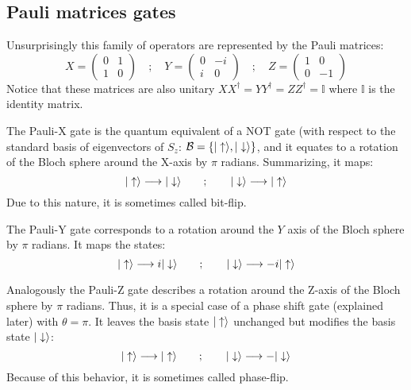 \subsection{Pauli matrices gates}
Unsurprisingly this family of operators are represented by the Pauli matrices:
\begin{equation}
  X = \left(\begin{array}{cc}
  0 & 1 \\
  1 & 0
  \end{array}\right)\quad;\quad
  Y = \left(\begin{array}{cc}
  0 & -i \\
  i & 0
  \end{array}\right)\quad;\quad
  Z = \left(\begin{array}{cc}
  1 & 0 \\
  0 & -1
  \end{array}\right)
\end{equation}
Notice that these matrices are also unitary $XX^\dagger=YY^\dagger=ZZ^\dagger= \mathbb{I}$ where $\mathbb{I}$ is the identity matrix.

The Pauli-X gate is the quantum equivalent of a NOT gate (with respect to the standard basis of eigenvectors of $S_z$: $\mathcal{B}=\left\{|\uparrow\rangle,|\downarrow\rangle\right\}$, and it equates to a rotation of the Bloch sphere around the X-axis by $\pi$ radians. Summarizing, it maps:
\begin{equation}
  |\uparrow\rangle \longrightarrow |\downarrow\rangle \quad\quad;\quad\quad
  |\downarrow\rangle \longrightarrow |\uparrow\rangle
\end{equation}
Due to this nature, it is sometimes called bit-flip.

The Pauli-Y gate corresponds to a rotation around the $Y$ axis of the Bloch sphere by $\pi$ radians. It maps the states:
\begin{equation}
  |\uparrow\rangle \longrightarrow i|\downarrow\rangle \quad\quad;\quad\quad
  |\downarrow\rangle \longrightarrow -i|\uparrow\rangle
\end{equation}

Analogously the Pauli-Z gate describes a rotation around the Z-axis of the Bloch sphere by $\pi$ radians. Thus, it is a special case of a phase shift gate (explained later) with $\theta=\pi$. It leaves the basis state $|\uparrow\rangle$ unchanged but modifies the basis state $|\downarrow\rangle$:
\begin{equation}
  |\uparrow\rangle \longrightarrow |\uparrow\rangle \quad\quad;\quad\quad
  |\downarrow\rangle \longrightarrow -|\downarrow\rangle
\end{equation}
Because of this behavior, it is sometimes called phase-flip.


